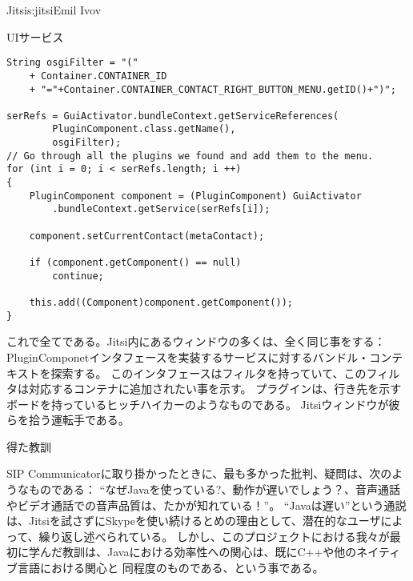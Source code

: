 \begin{aosachapter}{Jitsi}{s:jitsi}{Emil Ivov}
\begin{aosasect1}{UIサービス}
\begin{verbatim}
String osgiFilter = "("
    + Container.CONTAINER_ID
    + "="+Container.CONTAINER_CONTACT_RIGHT_BUTTON_MENU.getID()+")";

serRefs = GuiActivator.bundleContext.getServiceReferences(
        PluginComponent.class.getName(),
        osgiFilter);
// Go through all the plugins we found and add them to the menu.
for (int i = 0; i < serRefs.length; i ++)
{
    PluginComponent component = (PluginComponent) GuiActivator
        .bundleContext.getService(serRefs[i]);

    component.setCurrentContact(metaContact);

    if (component.getComponent() == null)
        continue;

    this.add((Component)component.getComponent());
}
\end{verbatim}

\noindent これで全てである。Jitsi内にあるウィンドウの多くは、全く同じ事をする：
PluginComponetインタフェースを実装するサービスに対するバンドル・コンテキストを探索する。
このインタフェースはフィルタを持っていて、このフィルタは対応するコンテナに追加されたい事を示す。
プラグインは、行き先を示すボードを持っているヒッチハイカーのようなものである。
Jitsiウィンドウが彼らを拾う運転手である。

\end{aosasect1}

\begin{aosasect1}{得た教訓}

SIP Communicatorに取り掛かったときに、最も多かった批判、疑問は、次のようなものである：
``なぜJavaを使っている?、動作が遅いでしょう？、音声通話やビデオ通話での音声品質は、たかが知れている！''。
``Javaは遅い''という通説は、Jitsiを試さずにSkypeを使い続けるとめの理由として、潜在的なユーザによって、繰り返し述べられている。
しかし、このプロジェクトにおける我々が最初に学んだ教訓は、Javaにおける効率性への関心は、既にC++や他のネイティブ言語における関心と
同程度のものである、という事である。


\end{aosasect1}
\end{aosachapter}
